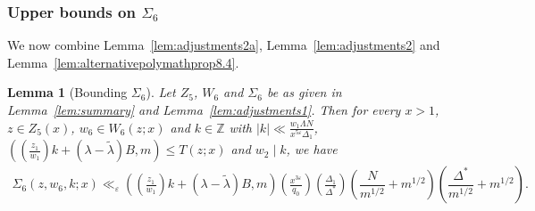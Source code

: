\documentclass{amsart}
\newtheorem{lemma}{Lemma}
\numberwithin{equation}{section}
\begin{document}
\subsubsection{Upper bounds on $\Sigma_6$} We now combine Lemma~\ref{lem:adjustments2a}, Lemma~\ref{lem:adjustments2} and  Lemma~\ref{lem:alternativepolymathprop8.4}. 

\begin{lemma}[Bounding $\Sigma_6$]\label{lem:concretebounds} Let $Z_5$, $W_6$ and $\Sigma_6$ be as given in Lemma~{\rm\ref{lem:summary}} and  Lemma~{\rm\ref{lem:adjustments1}}.   Then for every $x>1$, $z \in Z_5(x)$, $w_6 \in W_6(z;x)$  and  $k \in \mathbb{Z}$ with   $|k| \ll  \frac{w_1\Lambda N}{x^{5\varepsilon}\Delta_1}$,   $((\frac{z_1}{w_1})k+(\lambda-\widetilde{\lambda})B,m) \leq T(z;x)$  and
 $w_2 \mid k$, we have
\begin{align*}
 \Sigma_6(z,w_6,k;x) \ll_\varepsilon ((\tfrac{z_1}{w_1})k + (\lambda - \widetilde{\lambda})B,m)\left(\frac{x^{3\varepsilon}}{q_0} \right)\left(\frac{\Delta_1}{\Delta^*}\right)\left(\dfrac{N}{m^{1/2}} + m^{1/2} \right)\!\left(\dfrac{\Delta^*}{ m^{1/2} }  + m^{1/2}\right). 
\end{align*}
\end{lemma}
\end{document}
